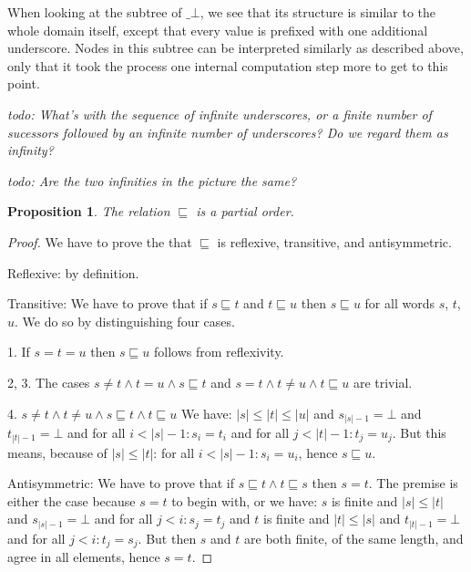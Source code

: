\documentclass[a4paper]{article}
\newcommand{\todo}[1]{\bigskip \noindent \emph{todo: #1}}
\newtheorem{thmPONuFisPartial}[defNuF]{Proposition}
\begin{document}
When looking at the subtree of $\_\bot$, we see that its structure is similar
to the whole domain itself, except that every value is prefixed with one additional
underscore.  Nodes in this subtree can be interpreted similarly as described
above, only that it took the process one internal computation step more to
get to this point.

\todo{What's with the sequence of infinite underscores, or a finite number of
sucessors followed by an infinite number of underscores?  Do we regard them as
infinity?}

\todo{Are the two infinities in the picture the same?}

\begin{thmPONuFisPartial}

The relation $\sqsubseteq$ is a partial order.

\end{thmPONuFisPartial}


\begin{proof}

We have to prove the that $\sqsubseteq$ is reflexive, transitive, and
antisymmetric.

Reflexive: by definition.

Transitive: We have to prove that if $s \sqsubseteq t$ and $t \sqsubseteq u$
then $s \sqsubseteq u$ for all words $s$, $t$, $u$. We do so by distinguishing
four cases.

1. If $s = t = u$ then $s \sqsubseteq u$ follows from reflexivity.

2, 3. The cases $s \neq t \wedge t = u \wedge s \sqsubseteq t$ and $s = t
\wedge t \neq u \wedge t \sqsubseteq u$ are trivial.

4. $s \neq t \wedge t \neq u \wedge s \sqsubseteq t \wedge t \sqsubseteq u$ We
have: $|s| \leq |t| \leq |u|$ and $s_{|s|-1} = \bot$ and $t_{|t|-1} = \bot$ and
for all $i < |s|-1: s_i = t_i$ and for all $j < |t|-1: t_j = u_j$.  But this
means, because of $|s| \leq |t|$: for all $i < |s|-1: s_i = u_i$, hence $s
\sqsubseteq u$.

Antisymmetric: We have to prove that if $s \sqsubseteq t \wedge t \sqsubseteq
s$ then $s = t$.  The premise is either the case because $s = t$ to begin with,
or we have: $s$ is finite and $|s| \leq |t|$ and $s_{|s|-1} = \bot$ and for all $j <
i: s_j = t_j$ and $t$ is finite and $|t| \leq |s|$ and $t_{|t|-1} = \bot$ and for all
$j < i: t_j = s_j$.  But then $s$ and $t$ are both finite, of the same length,
and agree in all elements, hence $s = t$.

\end{proof}
\end{document}
